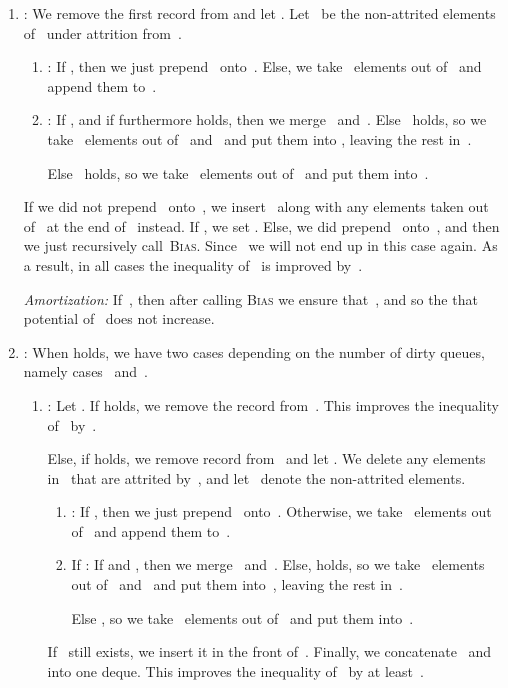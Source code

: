 \documentclass[]{article}
\begin{document}
\begin{enumerate}[1)]
  \item \label{it:Blg0} : We remove the first record  from  and let .  Let~
    be the non-attrited elements of~ under attrition from~.
    \begin{enumerate}[1)]
      \item : If , then we just prepend~
        onto~. Else, we take~ elements out of~ and append them
        to~.
    
      \item : If , and if furthermore  holds, then we merge~ and~. Else~ holds, so we take~ elements out of~ and~ and
        put them into , leaving the rest in~.
        
        Else~ holds, so we take~ elements out of~ and put
        them into~.
    \end{enumerate}
    If we did not prepend~ onto~, we insert~ along with any
    elements taken out of~ at the end of~ instead. If , we set . Else, we did prepend~ onto~,
    and then we just recursively call~\textsc{Bias}. Since~ we will
    not end up in this case again.  As a result, in all cases the inequality
    of~ is improved by~.

    \textit{Amortization:} If~, then after calling
    \textsc{Bias} we ensure that~, and so the that
    potential of~ does not increase.

    \item \label{it:Beq0} : When  holds, we have two
      cases depending on the number of dirty queues, namely cases ~and~.
    \begin{enumerate}[1)]
      \item \label{it:KQgt1} : Let . If
         holds, we remove the record
         from~.  This improves the
        inequality of~ by~.

      Else, if 
      holds, we remove record 
      from~ and let . We
      delete any elements in~ that are attrited by~, and let~
      denote the non-attrited elements.
      \begin{enumerate}[1)]
        \item : If , then we just
          prepend~ onto~. Otherwise, we take~ elements out
          of~ and append them to~.
    
        \item If : If  and , then we merge~ and~. Else, 
          holds, so we take~ elements out of~ and~ and put them
          into~, leaving the rest in~.
        
        Else , so we take~ elements out of~ and put them
        into~.
    \end{enumerate}
    If~ still exists, we insert it in the front of~. Finally,
    we concatenate~ and~ into one deque. This improves
    the inequality of~ by at least~.


\end{enumerate}
\end{enumerate}
\end{document}
